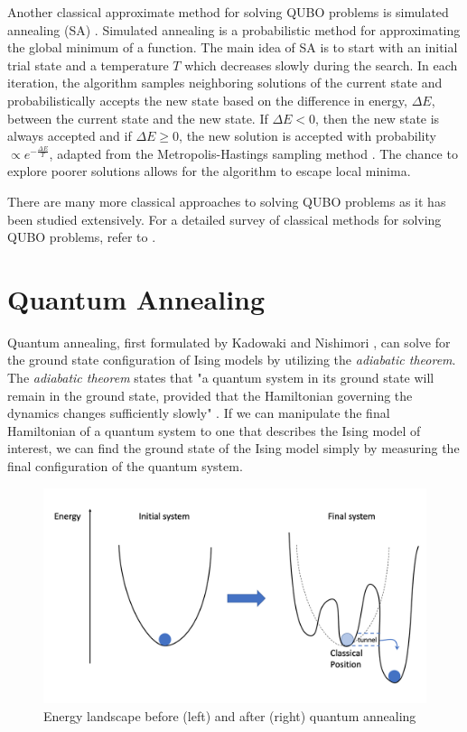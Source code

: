 Another classical approximate method for solving QUBO problems is simulated annealing (SA) \cite{KATAYAMA2001103}. Simulated annealing \cite{Kirkpatrick} is a probabilistic method for approximating the global minimum of a function. The main idea of SA is to start with an initial trial state and a temperature $T$ which decreases slowly during the search. In each iteration, the algorithm samples neighboring solutions of the current state and probabilistically accepts the new state based on the difference in energy, $\Delta E$, between the current state and the new state. If $\Delta E < 0$, then the new state is always accepted and if $\Delta E \geq 0$, the new solution is accepted with probability $\propto e^{-\frac{\Delta E}{T}}$, adapted from the Metropolis-Hastings sampling method \cite{metropolissampling}. The chance to explore poorer solutions allows for the algorithm to escape local minima.

There are many more classical approaches to solving QUBO problems as it has been studied extensively. For a detailed survey of classical methods for solving QUBO problems, refer to \cite{punnen2022quadratic}.

\section{Quantum Annealing}\label{section:annealing}
Quantum annealing, first formulated by Kadowaki and Nishimori , can solve for the ground state configuration of Ising models by utilizing the \textit{adiabatic theorem}. The \textit{adiabatic theorem} states that "a quantum system in its ground state will remain in the ground state, provided that the Hamiltonian governing the dynamics changes sufficiently slowly" \cite{b14,b15}. If we can manipulate the final Hamiltonian of a quantum system to one that describes the Ising model of interest, we can find the ground state of the Ising model simply by measuring the final configuration of the quantum system.

\begin{figure}[h!]
    \centering
    \includegraphics[width=0.8\linewidth]{images/quantum_annealing.png}
    \caption{Energy landscape before (left) and after (right) quantum annealing}
    \label{quantumannealing}
\end{figure}

